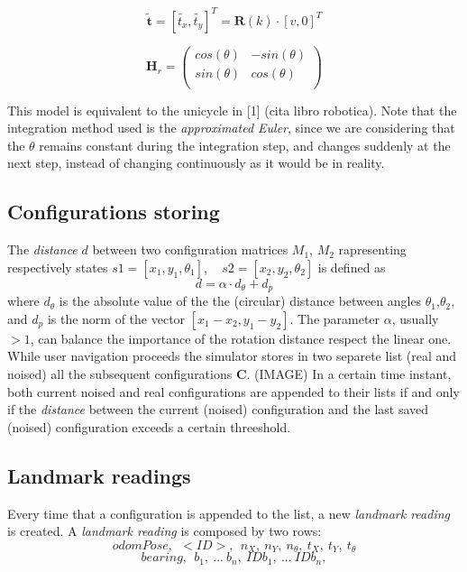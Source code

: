 \[ 
\tilde{\textbf{t}} = [\tilde{t_x},\tilde{t_y}]^T = \textbf{R}(k) \cdot [v,0]^T
\]

\[ 
\textbf{H}_r =
\left( \begin{array}{cc}
  cos(\theta)  & -sin(\theta)\\ 
  sin(\theta)  & cos(\theta) \\
\end{array} \right)
\]

This model is equivalent to the unicycle in [1] (cita libro robotica).
Note that the integration method used is the \textit{approximated Euler}, since we are considering that the $\theta$ remains constant during the integration step,
and changes suddenly at the next step, instead of changing continuously as it would be in reality.

\subsection{Configurations storing}
The \textit{distance} $d$ between two configuration matrices $M_1$, $M_2$ rapresenting respectively states $s1 = [x_1,y_1,\theta_1]$, ~ $s2 = [x_2,y_2,\theta_2]$
is defined as
\[ 
d = \alpha \cdot d_{\theta} + d_p
\]
where $d_{\theta}$ is the absolute value of the the (circular) distance between angles $\theta_1$,$\theta_2$,
and $d_p$ is the norm of the vector $[x_1 - x_2,y_1 - y_2]$.
The parameter $\alpha$, usually $> 1$, can balance the importance of the rotation distance respect the linear one.\\
While user navigation proceeds the simulator stores in two separete list (real and noised) all the subsequent configurations $\textbf{C}$.
(IMAGE)
In a certain time instant, both current noised and real configurations are appended to their lists if and only if the \textit{distance} between the current (noised) configuration 
and the last saved (noised) configuration exceeds a certain threeshold.
\\
\subsection{Landmark readings}
Every time that a configuration is appended to the list, a new \textit{landmark reading} is created.
A \textit{landmark reading} is composed by two rows:\\
\[ 
odomPose, ~~ <ID>, ~~ n_X, ~ n_Y, ~  n_{\theta}, ~  t_X, ~  t_Y, ~ t_{\theta}
\]
\[
bearing, ~~ b_1, ~ ... ~ b_n, ~ IDb_1, ~ ... ~ IDb_n, 
\]

